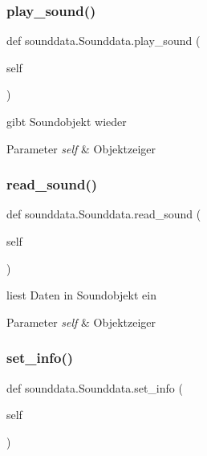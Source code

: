 \subsubsection{\texorpdfstring{play\+\_\+sound()}{play\_sound()}}
{\footnotesize\ttfamily def sounddata.\+Sounddata.\+play\+\_\+sound (\begin{DoxyParamCaption}\item[{}]{self }\end{DoxyParamCaption})}



gibt Soundobjekt wieder 


\begin{DoxyParams}{Parameter}
{\em self} & Objektzeiger \\
\hline
\end{DoxyParams}
\mbox{\label{classsounddata_1_1_sounddata_a88a9e2052bdaa80e988bb0d4f5610495}} 
\subsubsection{\texorpdfstring{read\+\_\+sound()}{read\_sound()}}
{\footnotesize\ttfamily def sounddata.\+Sounddata.\+read\+\_\+sound (\begin{DoxyParamCaption}\item[{}]{self }\end{DoxyParamCaption})}



liest Daten in Soundobjekt ein 


\begin{DoxyParams}{Parameter}
{\em self} & Objektzeiger \\
\hline
\end{DoxyParams}
\mbox{\label{classsounddata_1_1_sounddata_a198de54d49c935b70cf8545980af1c26}} 
\subsubsection{\texorpdfstring{set\+\_\+info()}{set\_info()}}
{\footnotesize\ttfamily def sounddata.\+Sounddata.\+set\+\_\+info (\begin{DoxyParamCaption}\item[{}]{self }\end{DoxyParamCaption})}



